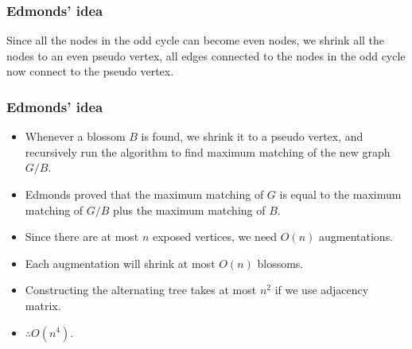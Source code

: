 \documentclass[hyperref={pdfpagelabels=false}]{beamer}
\begin{document}
\frame
{
	\frametitle{Edmonds' idea}
	
	\begin{overlayarea}{\textwidth}{1.5cm}
	Since all the nodes in the odd cycle can become even nodes, we shrink all the nodes to an even pseudo vertex, all edges connected to the nodes in the odd cycle now connect to the pseudo vertex.
	\end{overlayarea}
		
	\transdissolve

	\begin{overlayarea}{\textwidth}{1.5cm}
	\begin{center}
	\end{center}
	\end{overlayarea}
}

\frame
{
	\frametitle{Edmonds' idea}
	
	\begin{itemize}
		\item<1-> Whenever a blossom $B$ is found, we shrink it to a pseudo vertex, and recursively run the algorithm to find maximum matching of the new graph $G/B$.
		\item<2-> Edmonds proved that the maximum matching of $G$ is equal to the maximum matching of $G/B$ plus the maximum matching of $B$.
		\item<3-> Since there are at most $n$ exposed vertices, we need $O(n)$ augmentations.
		\item<4-> Each augmentation will shrink at most $O(n)$ blossoms.
		\item<5-> Constructing the alternating tree takes at most $n^{2}$ if we use adjacency matrix.
		\item<6-> $\therefore O(n^{4})$.
	\end{itemize}
	
}
\end{document}
